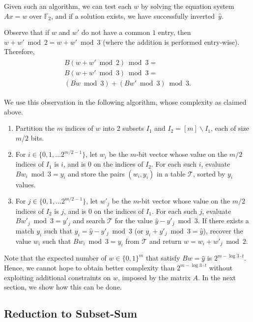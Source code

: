 \documentclass{article}
\begin{document}
Given such an algorithm, we can test each $w$ by solving the equation system $Ax = w$ over $\mathbb{F}_2$, and if a solution exists, we have successfully inverted~$\hat{y}$.

Observe that if $w$ and $w'$ do not have a common $1$ entry, then $w + w' \bmod 2 = w + w' \bmod 3$
(where the addition is performed entry-wise). Therefore,
\begin{align}
\label{eq:lineara}
\begin{split}
B(w + w' \bmod 2) \bmod 3 = \\
B(w + w' \bmod 3) \bmod 3 = \\
(Bw \bmod 3) + (Bw' \bmod 3) \bmod 3.
\end{split}
\end{align}

We use this observation in the following algorithm, whose complexity as claimed above.
\begin{enumerate}
  \item Partition the $m$ indices of $w$ into 2 subsets $I_1$ and $I_2 = [m] \backslash I_1$, each of size $m/2$ bits.
  \item For $i \in \{0,1,\ldots 2^{m/2 -1}\}$, let $w_i$ be the $m$-bit vector whose value on the $m/2$ indices of $I_1$ is $i$, and is 0 on the indices of $I_2$. For each such $i$,
      evaluate $B w_i \bmod 3 = y_i$ and store the pairs $(w_i,y_i)$ in a table $\mathcal{T}$, sorted by $y_i$ values.
  \item For $j \in \{0,1,\ldots 2^{m/2 -1}\}$, let $w'_j$ be the $m$-bit vector whose value on the $m/2$ indices of $I_2$ is $j$, and is 0 on the indices of $I_1$. For each such $j$,
      evaluate $B w'_j \bmod 3 = y'_j$ and search $\mathcal{T}$ for the value $\hat{y} - y'_j \bmod 3$. If there exists a match $y_i$ such that $y_i = \hat{y} - y'_j \bmod 3$ (or $y_i + y'_j \bmod 3 = \hat{y}$), recover the value $w_i$ such that $B w_i \bmod 3 = y_i$ from $\mathcal{T}$
      and return $w = w_i + w'_j \bmod 2$.
\end{enumerate}

Note that the expected number of $w \in \{0,1\}^m$ that satisfy $B w = \hat{y}$ is $2^{m - \log 3 \cdot t}$. Hence, we cannot hope to obtain better complexity than $2^{m - \log 3 \cdot t}$ without exploiting additional constraints on $w$, imposed by the matrix $A$. In the next section, we show how this can be done.


\subsection{Reduction to Subset-Sum}
\label{sec:improved}
\end{document}
